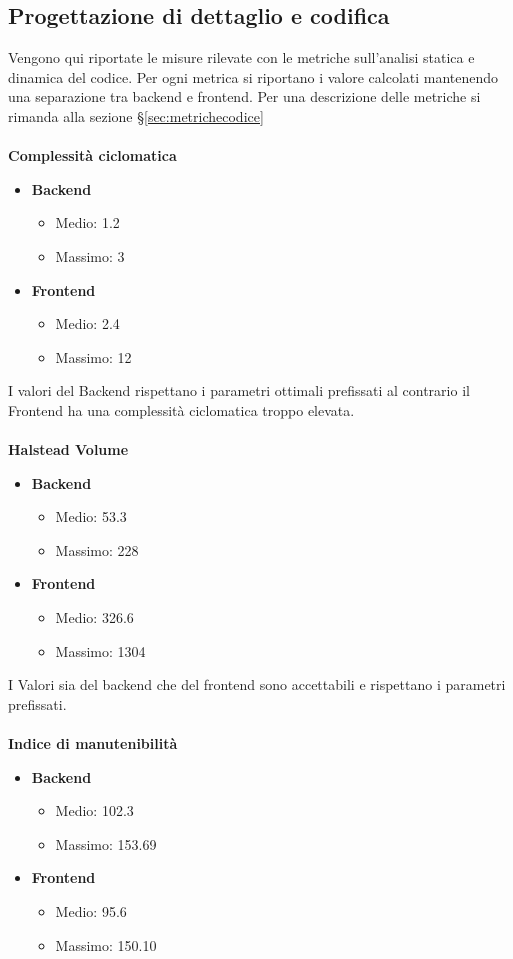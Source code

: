 \subsection{Progettazione di dettaglio e codifica}
Vengono qui riportate le misure rilevate con le metriche sull’analisi statica e dinamica del codice. Per ogni metrica si riportano i valore calcolati mantenendo una separazione tra backend e frontend. Per una descrizione delle metriche si rimanda alla sezione \S\ref{sec:metrichecodice}\\\\
\textbf{Complessità ciclomatica}
\begin{itemize}
\item \textbf{Backend}
\begin{itemize}
\item Medio: 1.2
\item Massimo: 3
\end{itemize}
\item \textbf{Frontend}
\begin{itemize}
\item Medio: 2.4
\item Massimo: 12
\end{itemize}
\end{itemize}
I valori del Backend rispettano i parametri ottimali prefissati al contrario il Frontend ha una complessità ciclomatica troppo elevata.
\\\\
\textbf{Halstead Volume}
\begin{itemize}
\item \textbf{Backend}
\begin{itemize}
\item Medio: 53.3
\item Massimo: 228
\end{itemize}
\item \textbf{Frontend}
\begin{itemize}
\item Medio: 326.6
\item Massimo: 1304
\end{itemize}
\end{itemize}
I Valori sia del backend che del frontend sono accettabili e rispettano i parametri prefissati.
\\\\
\textbf{Indice di manutenibilità}
\begin{itemize}
\item \textbf{Backend}
\begin{itemize}
\item Medio: 102.3
\item Massimo: 153.69
\end{itemize}
\item \textbf{Frontend}
\begin{itemize}
\item Medio: 95.6
\item Massimo: 150.10
\end{itemize}
\end{itemize}
